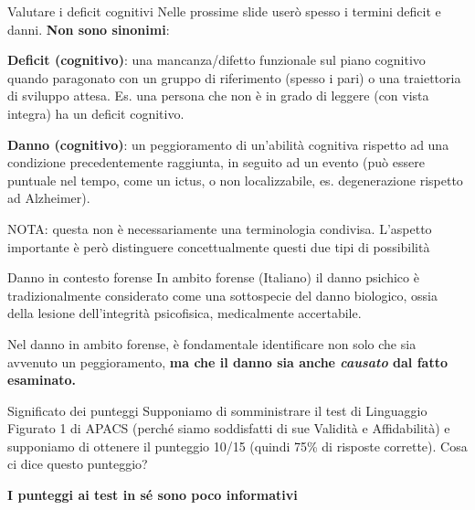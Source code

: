 \documentclass[
  ignorenonframetext,
]{beamer}
\begin{document}
\begin{frame}{Valutare i deficit cognitivi}
\label{valutare-i-deficit-cognitivi}
Nelle prossime slide userò spesso i termini deficit e danni. \textbf{Non
sono sinonimi}:

\textbf{Deficit (cognitivo)}: una mancanza/difetto funzionale sul piano
cognitivo quando paragonato con un gruppo di riferimento (spesso i pari)
o una traiettoria di sviluppo attesa. Es. una persona che non è in grado
di leggere (con vista integra) ha un deficit cognitivo.

\pause

\textbf{Danno (cognitivo)}: un peggioramento di un'abilità cognitiva
rispetto ad una condizione precedentemente raggiunta, in seguito ad un
evento (può essere puntuale nel tempo, come un ictus, o non
localizzabile, es. degenerazione rispetto ad Alzheimer). \vspace{2em}

\footnotesize

NOTA: questa non è necessariamente una terminologia condivisa. L'aspetto
importante è però distinguere concettualmente questi due tipi di
possibilità
\end{frame}

\begin{frame}{Danno in contesto forense}
\label{danno-in-contesto-forense}
In ambito forense (Italiano) il danno psichico è tradizionalmente
considerato come una sottospecie del danno biologico, ossia della
lesione dell'integrità psicofisica, medicalmente accertabile.

Nel danno in ambito forense, è fondamentale identificare non solo che
sia avvenuto un peggioramento, \textbf{ma che il danno sia anche
\emph{causato} dal fatto esaminato.}
\end{frame}

\begin{frame}{Significato dei punteggi}
\label{significato-dei-punteggi}
Supponiamo di somministrare il test di Linguaggio Figurato 1 di APACS
(perché siamo soddisfatti di sue Validità e Affidabilità) e supponiamo
di ottenere il punteggio 10/15 (quindi 75\% di risposte corrette). Cosa
ci dice questo punteggio? \pause

\begin{center}
  \textbf{I punteggi ai test in sé sono poco informativi}
\end{center}
\pause
\end{frame}
\end{document}
